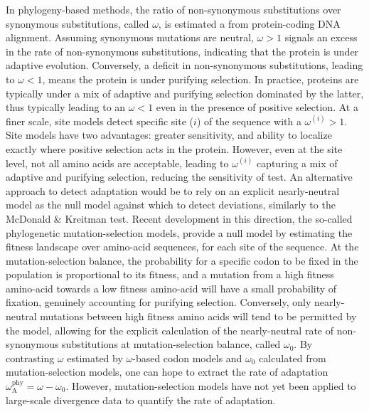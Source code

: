\documentclass{article}
\begin{document}
    In phylogeny-based methods, the ratio of non-synonymous substitutions over synonymous substitutions, called $\omega$, is estimated a from protein-coding DNA alignment\cite{muse_likelihood_1994,goldman_codonbased_1994}.
    Assuming synonymous mutations are neutral, $\omega>1$ signals an excess in the rate of non-synonymous substitutions, indicating that the protein is under adaptive evolution.
    Conversely, a deficit in non-synonymous substitutions, leading to $\omega<1$, means the protein is under purifying selection.
    In practice, proteins are typically under a mix of adaptive and purifying selection dominated by the latter, thus typically leading to an $\omega<1$ even in the presence of positive selection.
    At a finer scale, site models detect specific site ($i$) of the sequence with a $\omega^{(i)}>1$\cite{yang_codonsubstitution_2000, kosiol_patterns_2008}.
    Site models have two advantages: greater sensitivity, and ability to localize exactly where positive selection acts in the protein.
    However, even at the site level, not all amino acids are acceptable, leading to $\omega^{(i)}$ capturing a mix of adaptive and purifying selection, reducing the sensitivity of test.
    An alternative approach to detect adaptation would be to rely on an explicit nearly-neutral model as the null model against which to detect deviations, similarly to the McDonald \& Kreitman test.
    Recent development in this direction, the so-called phylogenetic mutation-selection models, provide a null model by estimating the fitness landscape over amino-acid sequences, for each site of the sequence\cite{yang_mutationselection_2008, halpern_evolutionary_1998, rodrigue_mechanistic_2010}.
    At the mutation-selection balance, the probability for a specific codon to be fixed in the population is proportional to its fitness, and a mutation from a high fitness amino-acid towards a low fitness amino-acid will have a small probability of fixation, genuinely accounting for purifying selection.
    Conversely, only nearly-neutral mutations between high fitness amino acids will tend to be permitted by the model, allowing for the explicit calculation of the nearly-neutral rate of non-synonymous substitutions at mutation-selection balance, called $\omega_{0}$\cite{spielman_relationship_2015, rodrigue_detecting_2017}.
    By contrasting $\omega$ estimated by $\omega$-based codon models and $\omega_{0}$ calculated from mutation-selection models, one can hope to extract the rate of adaptation $\omega_{\mathrm{A}}^{\mathrm{phy}} = \omega - \omega_{0}$.
    However, mutation-selection models have not yet been applied to large-scale divergence data to quantify the rate of adaptation\cite{rodrigue_detecting_2017}.
\end{document}

